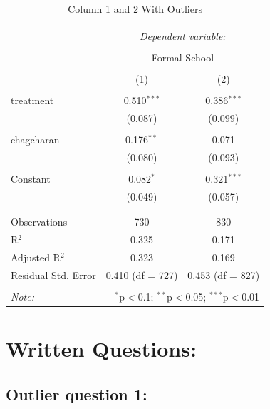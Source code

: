 \documentclass[
]{article}
\begin{document}
\begin{table}[!htbp] \centering 
  \caption{Column 1 and 2 With Outliers} 
  \label{} 
\begin{tabular}{@{\extracolsep{5pt}}lcc} 
\\[-1.8ex]\hline 
\hline \\[-1.8ex] 
 & \multicolumn{2}{c}{\textit{Dependent variable:}} \\ 
\cline{2-3} 
\\[-1.8ex] & \multicolumn{2}{c}{Formal School} \\ 
\\[-1.8ex] & (1) & (2)\\ 
\hline \\[-1.8ex] 
 treatment & 0.510$^{***}$ & 0.386$^{***}$ \\ 
  & (0.087) & (0.099) \\ 
  & & \\ 
 chagcharan & 0.176$^{**}$ & 0.071 \\ 
  & (0.080) & (0.093) \\ 
  & & \\ 
 Constant & 0.082$^{*}$ & 0.321$^{***}$ \\ 
  & (0.049) & (0.057) \\ 
  & & \\ 
\hline \\[-1.8ex] 
Observations & 730 & 830 \\ 
R$^{2}$ & 0.325 & 0.171 \\ 
Adjusted R$^{2}$ & 0.323 & 0.169 \\ 
Residual Std. Error & 0.410 (df = 727) & 0.453 (df = 827) \\ 
\hline 
\hline \\[-1.8ex] 
\textit{Note:}  & \multicolumn{2}{r}{$^{*}$p$<$0.1; $^{**}$p$<$0.05; $^{***}$p$<$0.01} \\ 
\end{tabular} 
\end{table}

\newpage

\hypertarget{written-questions}{%
\section{\texorpdfstring{\textbf{Written
Questions:}}{Written Questions:}}\label{written-questions}}

\hypertarget{outlier-question-1}{%
\subsection{Outlier question 1:}\label{outlier-question-1}}
\end{document}
